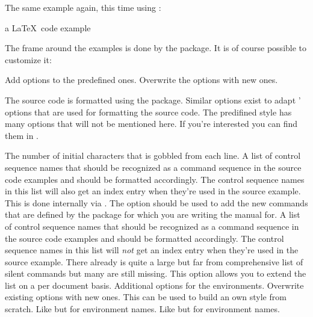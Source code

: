 \documentclass[load-preamble]{cnltx-doc}
\newcommand*\file[1]{\code{#1}}
\begin{document}
The same example again, this time using :

\begin{example}
  a \LaTeX\ code example
\end{example}

The frame around the examples is done by the  package.  It is of
course possible to customize it:
\begin{options}
  \Default
    Add options to the predefined ones.
    Overwrite the options with new ones.
\end{options}

The source code is formatted using the  package.  Similar
options exist to adapt ' options that are used for formatting
the source code.  The predifined style has many options that will not be
mentioned here.  If you're interested you can find them in
\file{cnltx-csnames.sty}.
\begin{options}
    The number of initial characters that is gobbled from each line.
  \Default
    A list of control sequence names that should be recognized as a command
    sequence in the source code examples and should be formatted accordingly.
    The control sequence names in this list will also get an index entry when
    they're used in the source example.  This is done internally via
    .  The option should be used to add the new commands that are
    defined by the package for which you are writing the manual for.
    A list of control sequence names that should be recognized as a command
    sequence in the source code examples and should be formatted accordingly.
    The control sequence names in this list will \emph{not} get an index entry
    when they're used in the source example.  There already is quite a large
    but far from comprehensive list of silent commands but many are still
    missing.  This option allows you to extend the list on a per document
    basis.
  \Default
    Additional options for the  environments.
    Overwrite existing options with new ones.  This can be used to build an own
    style from scratch.
  \Default
    Like  but for environment names.
    Like  but for environment names.
\end{options}
\end{document}

